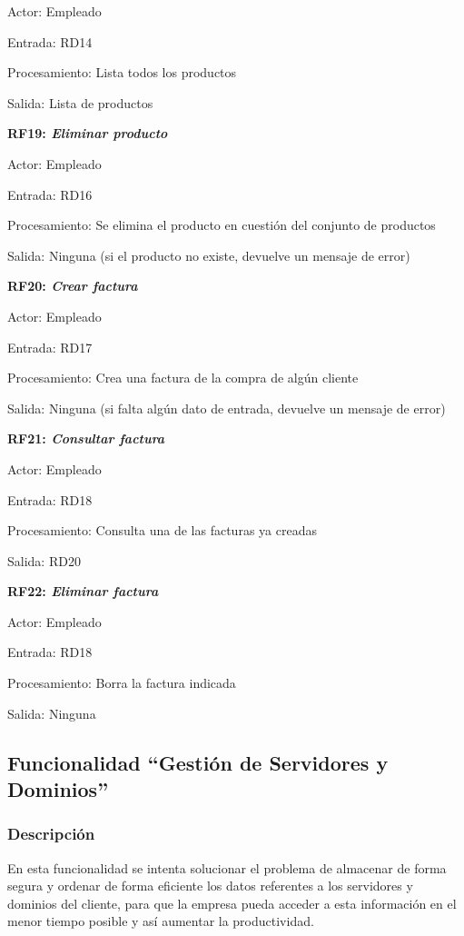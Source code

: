 \documentclass[paper=a4, fontsize=11pt, spanish]{scrartcl}
\begin{document}
	Actor: Empleado

	Entrada: RD14

	Procesamiento: Lista todos los productos

	Salida: Lista de productos

	\setlength{\parindent}{0em}
	\textbf{RF19: \textit{Eliminar producto}}
	\setlength{\parindent}{2em}

	Actor: Empleado

	Entrada: RD16

	Procesamiento: Se elimina el producto en cuestión del conjunto de productos

	Salida: Ninguna (si el producto no existe, devuelve un mensaje de error)

	\setlength{\parindent}{0em}
	\textbf{RF20: \textit{Crear factura}}
	\setlength{\parindent}{2em}

	Actor: Empleado

	Entrada: RD17

	Procesamiento: Crea una factura de la compra de algún cliente

	Salida: Ninguna (si falta algún dato de entrada, devuelve un mensaje de error)

	\setlength{\parindent}{0em}
	\textbf{RF21: \textit{Consultar factura}}
	\setlength{\parindent}{2em}

	Actor: Empleado

	Entrada: RD18

	Procesamiento: Consulta una de las facturas ya creadas

	Salida: RD20
	
	\setlength{\parindent}{0em}
	\textbf{RF22: \textit{Eliminar factura}}
	\setlength{\parindent}{2em}
	
	Actor: Empleado
	
	Entrada: RD18
	
	Procesamiento: Borra la factura indicada
	
	Salida: Ninguna


\subsection{Funcionalidad “Gestión de Servidores y Dominios”}

\subsubsection{Descripción}
\setlength{\parindent}{3em} En esta funcionalidad se intenta solucionar el problema de almacenar de forma segura y ordenar de forma eficiente los datos referentes a los servidores y dominios del cliente, para que la empresa pueda acceder a esta información en el menor tiempo posible y así aumentar la productividad.
\end{document}
